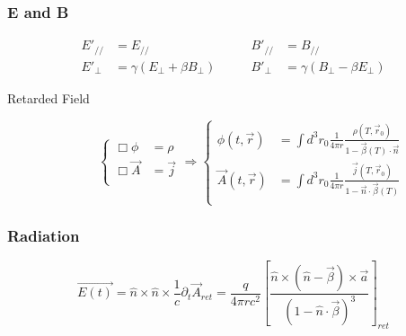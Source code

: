 \subsubsection{E and B}
\begin{equation}
    \label{eqn:em::sr:::E&B}
    \begin{aligned}
	E'_{//} &= E_{//}   \qquad&   B'_{//} &= B_{//}	\\
	E'_{\perp} &= \gamma (E_{\perp} + \beta B_{\perp})   \qquad& B'_{\perp} &= \gamma(B_{\perp} - \beta E_{\perp})
    \end{aligned}
\end{equation}
\begin{description}
    \item [Retarded Field]
	\begin{equation}
	    \label{eqn:em::retardedField}
	    \left\{
	    \begin{aligned}
		\Box\phi &= \rho	\\
		\Box \vec{A} &= \vec{j}	\\
	    \end{aligned}
            \right.
	    \Rightarrow
	    \left\{
	    \begin{aligned}
		\phi(t,\vec{r}) &= \int d^3r_0 \frac{1}{4\pi r}\frac{\rho(T,\vec{r}_0)}{1-\vec{\beta}(T)\cdot\vec{n}}   \\
		\vec{A}(t,\vec{r})  &= \int d^3r_0 \frac{1}{4\pi r}\frac{\vec{j}(T,\vec{r}_0)}{1-\vec{n}\cdot\vec{\beta}(T)}   \\ 
	    \end{aligned}
            \right.
	\end{equation}
\end{description}

\subsubsection{Radiation}
\begin{equation}
    \vec{E(t)} = \hat{n}\times\hat{n}\times\frac{1}{c}\partial_t\vec{A}_{ret} = \frac{q}{4\pi rc^2}\left[\frac{\hat{n}\times(\hat{n}-\vec{\beta})\times\vec{a}}{(1-\hat{n}\cdot\vec{\beta})^3}\right]_{ret}
\end{equation}
